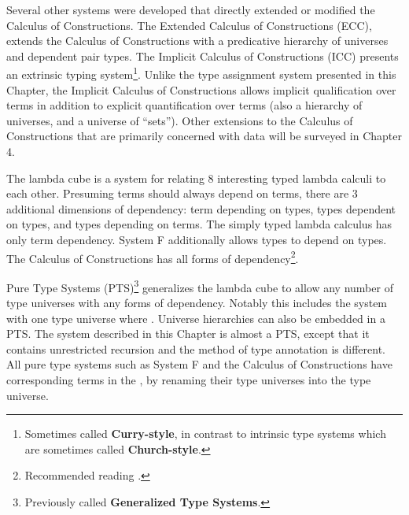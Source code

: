 Several other systems were developed that directly extended or modified the Calculus of Constructions.
The Extended Calculus of Constructions (\ac{ECC})\cite{luo1990extended,luo1994computation}, extends the Calculus of Constructions with a predicative hierarchy of universes and dependent pair types.
The Implicit Calculus of Constructions (\ac{ICC})\cite{10.1007/3-540-45413-6_27,10.1007/978-3-540-78499-9_26} presents an extrinsic typing system\footnote{
  Sometimes called \textbf{Curry-style}, in contrast to intrinsic type systems which are sometimes called \textbf{Church-style}.
}.
Unlike the type assignment system presented in this Chapter, the Implicit Calculus of Constructions allows implicit qualification over terms in addition to explicit quantification over terms (also a hierarchy of universes, and a universe of ``sets'').
Other extensions to the Calculus of Constructions that are primarily concerned with data will be surveyed in Chapter 4.
 
The lambda cube is a system for relating 8 interesting typed lambda calculi to each other.
Presuming terms should always depend on terms, there are 3 additional dimensions of dependency: term depending on types, types dependent on types, and types depending on terms.
The simply typed lambda calculus has only term dependency.
System F additionally allows types to depend on types.
The Calculus of Constructions has all forms of dependency\footnote{Recommended reading \cite[Chapter 14]{sorensen2006lectures}.}.
 
Pure Type Systems (\ac{PTS})\footnote{
  Previously called \textbf{Generalized Type Systems}.
} generalizes the lambda cube to allow any number of type universes with any forms of dependency.
Notably this includes the system with one type universe where \tit{}.
Universe hierarchies can also be embedded in a \ac{PTS}.
The system described in this Chapter is almost a \ac{PTS}, except that it contains unrestricted recursion and the method of type annotation is different.
All pure type systems such as System F and the Calculus of Constructions have corresponding terms in the \slang{}, by renaming their type universes into the \slang{} type universe.
 
 
